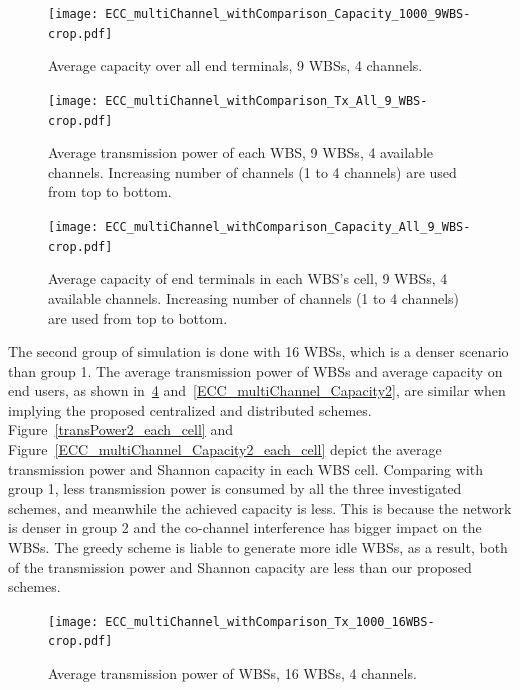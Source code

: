 \documentclass[times]{ettauth}
\theoremstyle{mytheoremstyle}
\theoremstyle{mytheoremstyle}
\theoremstyle{mytheoremstyle}
\begin{document}
     \begin{figure}[h!]
       \centering
       \texttt{[image: ECC\_multiChannel\_withComparison\_Capacity\_1000\_9WBS-crop.pdf]}
       \caption{Average capacity over all end terminals,  9 WBSs, 4 channels.}
	\label{ECC_multiChannel_Capacity}
     \end{figure}
 \begin{figure}[h!]
    \centering
      \texttt{[image: ECC\_multiChannel\_withComparison\_Tx\_All\_9\_WBS-crop.pdf]}
    \caption{Average transmission power of each WBS, 9 WBSs, 4 available channels. Increasing number of channels (1 to 4 channels) are used from top to bottom.}
\label{transPower_each_cell}    
  \end{figure}
  
     \begin{figure}[h!]
       \centering
       \texttt{[image: ECC\_multiChannel\_withComparison\_Capacity\_All\_9\_WBS-crop.pdf]}
       \caption{Average capacity of end terminals in each WBS's cell,  9 WBSs, 4 available channels. Increasing number of channels (1 to 4 channels) are used from top to bottom.}
	\label{ECC_multiChannel_Capacity_each_cell}
     \end{figure}


The second group of simulation is done with 16 WBSs, which is a denser scenario than group 1. 
The average transmission power of WBSs and average capacity on end users, as shown in~\ref{transPower2} and~\ref{ECC_multiChannel_Capacity2}, are similar when implying the proposed centralized and distributed schemes.
Figure~\ref{transPower2_each_cell} and Figure~\ref{ECC_multiChannel_Capacity2_each_cell} depict the average transmission power and Shannon capacity in each WBS cell.
Comparing with group 1, less transmission power is consumed by all the three investigated schemes, and meanwhile the achieved capacity is less.
This is because the network is denser in group 2 and the co-channel interference has bigger impact on the WBSs.
The greedy scheme is liable to generate more idle WBSs, as a result, both of the transmission power and Shannon capacity are less than our proposed schemes.


 \begin{figure}[h!]
    \centering
      \texttt{[image: ECC\_multiChannel\_withComparison\_Tx\_1000\_16WBS-crop.pdf]}
    \caption{Average transmission power of WBSs,  16 WBSs, 4 channels.}
\label{transPower2}    
  \end{figure}
  
\end{document}
